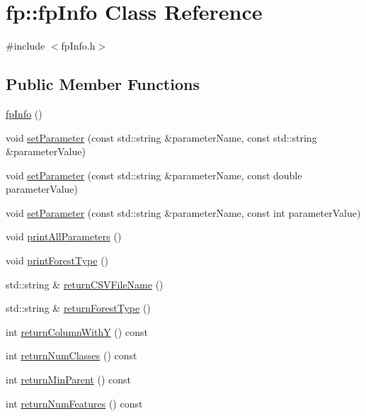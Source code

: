\hypertarget{classfp_1_1fpInfo}{}\section{fp\+:\+:fp\+Info Class Reference}
\label{classfp_1_1fpInfo}


{\ttfamily \#include $<$fp\+Info.\+h$>$}

\subsection*{Public Member Functions}
\begin{DoxyCompactItemize}
\item 
\hyperlink{classfp_1_1fpInfo_a2a0f7c8215dd138b690efe8a03484aef}{fp\+Info} ()
\item 
void \hyperlink{classfp_1_1fpInfo_ae4c749c466e983cb312cc08d38b2796e}{set\+Parameter} (const std\+::string \&parameter\+Name, const std\+::string \&parameter\+Value)
\item 
void \hyperlink{classfp_1_1fpInfo_a8ef4332ee98a1724ffd8614c4f80af91}{set\+Parameter} (const std\+::string \&parameter\+Name, const double parameter\+Value)
\item 
void \hyperlink{classfp_1_1fpInfo_aa2dd574c5a3764c250f1ccb1b11de1e0}{set\+Parameter} (const std\+::string \&parameter\+Name, const int parameter\+Value)
\item 
void \hyperlink{classfp_1_1fpInfo_a471bd46c828547d5b556f6f4e9fca70f}{print\+All\+Parameters} ()
\item 
void \hyperlink{classfp_1_1fpInfo_a1acfffe3b13e5cad548f92cd09ff7f46}{print\+Forest\+Type} ()
\item 
std\+::string \& \hyperlink{classfp_1_1fpInfo_a78c57a1955263d343c794f2156cd0a76}{return\+C\+S\+V\+File\+Name} ()
\item 
std\+::string \& \hyperlink{classfp_1_1fpInfo_a97280e7e3cadc5e653d8ef256eb2c82d}{return\+Forest\+Type} ()
\item 
int \hyperlink{classfp_1_1fpInfo_a288c05e4f29935aec7f32dc3c947e9d4}{return\+Column\+WithY} () const
\item 
int \hyperlink{classfp_1_1fpInfo_ae93937d429b68d88f40fd4f40b3339da}{return\+Num\+Classes} () const
\item 
int \hyperlink{classfp_1_1fpInfo_a64d8c3c57e3684a8dd829ed12ddcec0f}{return\+Min\+Parent} () const
\item 
int \hyperlink{classfp_1_1fpInfo_a30ec8a4f116421a193d33fe2052aaa9a}{return\+Num\+Features} () const

\end{DoxyCompactItemize}
